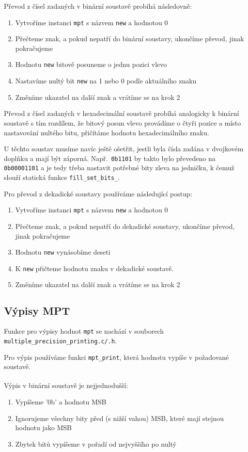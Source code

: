 Převod z čísel zadaných v binární soustavě probíhá následovně:
\begin{enumerate}
    \item Vytvoříme instanci \verb|mpt| s názvem \verb|new| a hodnotou 0
    \item Přečteme znak, a pokud nepatří do binární soustavy, ukončíme převod, jinak pokračujeme
    \item Hodnotu \verb|new| bitově posuneme o jednu pozici vlevo
    \item Nastavíme nultý bit \verb|new| na 1 nebo 0 podle aktuálního znaku
    \item Změníme ukazatel na další znak a vrátíme se na krok 2
\end{enumerate}
Převod z čísel zadaných v hexadecimální soustavě probíhá analogicky k binární soustavě s tím rozdílem, že bitový posun vlevo provádíme o čtyři pozice a místo nastavování nultého bitu, přičítáme hodnotu hexadecimálního znaku.

U těchto soustav musíme navíc ještě ošetřit, jestli byla čísla zadána v dvojkovém doplňku a mají být záporná. Např.~\verb|0b1101| by takto bylo převedeno na \verb|0b00001101| a je tedy třeba nastavit potřebné bity zleva na jedničku, k čemuž slouží statická funkce \verb|fill_set_bits_|.

Pro převod z dekadické soustavy používáme následující postup:
\begin{enumerate}
    \item Vytvoříme instanci \verb|mpt| s názvem \verb|new| a hodnotou 0
    \item Přečteme znak, a pokud nepatří do dekadické soustavy, ukončíme převod, jinak pokračujeme
    \item Hodnotu \verb|new| vynásobíme deseti
    \item K \verb|new| přičteme hodnotu znaku v dekadické soustavě.
    \item Změníme ukazatel na další znak a vrátíme se na krok 2
\end{enumerate}

\subsection{Výpisy MPT}
Funkce pro výpisy hodnot \verb|mpt| se nachází v souborech \\ \verb|multiple_precision_printing.c/.h|.

Pro výpis používáme funkci \verb|mpt_print|, která hodnotu vypíše v požadované soustavě.
\\\\
Výpis v binární soustavě je nejjednodušší:
\begin{enumerate}
    \item Vypíšeme '0b' a hodnotu MSB
    \item Ignorujeme všechny bity před (s nižší vahou) MSB, které mají stejnou hodnotu jako MSB
    \item Zbytek bitů vypíšeme v pořadí od nejvyššího po nultý
\end{enumerate} 

